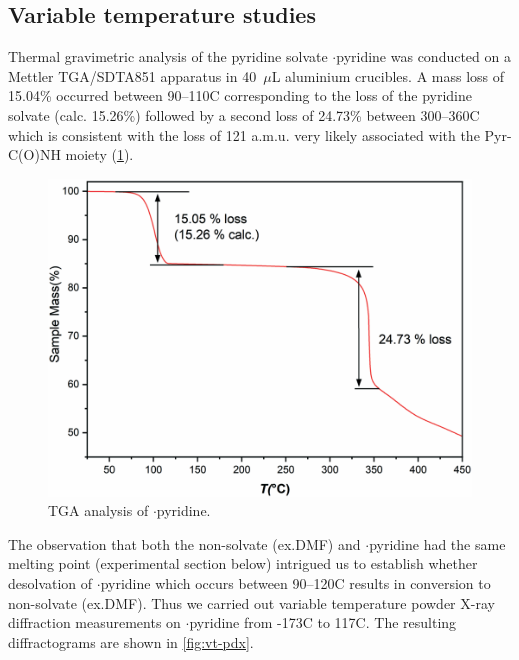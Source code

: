\begin{refsection}
\subsection{Variable temperature studies}
Thermal gravimetric analysis of the pyridine solvate $\cdot$pyridine was conducted on a Mettler TGA/SDTA851 apparatus in 40~$\mu$L aluminium crucibles.
A mass loss of 15.04\% occurred between 90--110\degree C corresponding to the loss of the pyridine solvate (calc. 15.26\%) followed by a second loss of 24.73\% between 300--360\degree C which is consistent with the loss of 121 a.m.u. very likely associated with the Pyr-C(O)NH moiety (\cref{fig:tga}).

\begin{figure}
    \centering
    \includegraphics[width=0.8\linewidth]{Figures/tga.pdf}
    \caption{TGA analysis of $\cdot$pyridine.}
    \label{fig:tga}
\end{figure}

The observation that both the non-solvate (ex.DMF) and $\cdot$pyridine had the same melting point (experimental section below) intrigued us to establish whether desolvation of $\cdot$pyridine which occurs between 90--120\degree C results in conversion to non-solvate (ex.DMF).
Thus we carried out variable temperature powder X-ray diffraction measurements on $\cdot$pyridine from -173\degree C to 117\degree C.
The resulting diffractograms are shown in \cref{fig:vt-pdx}.


\end{refsection}
